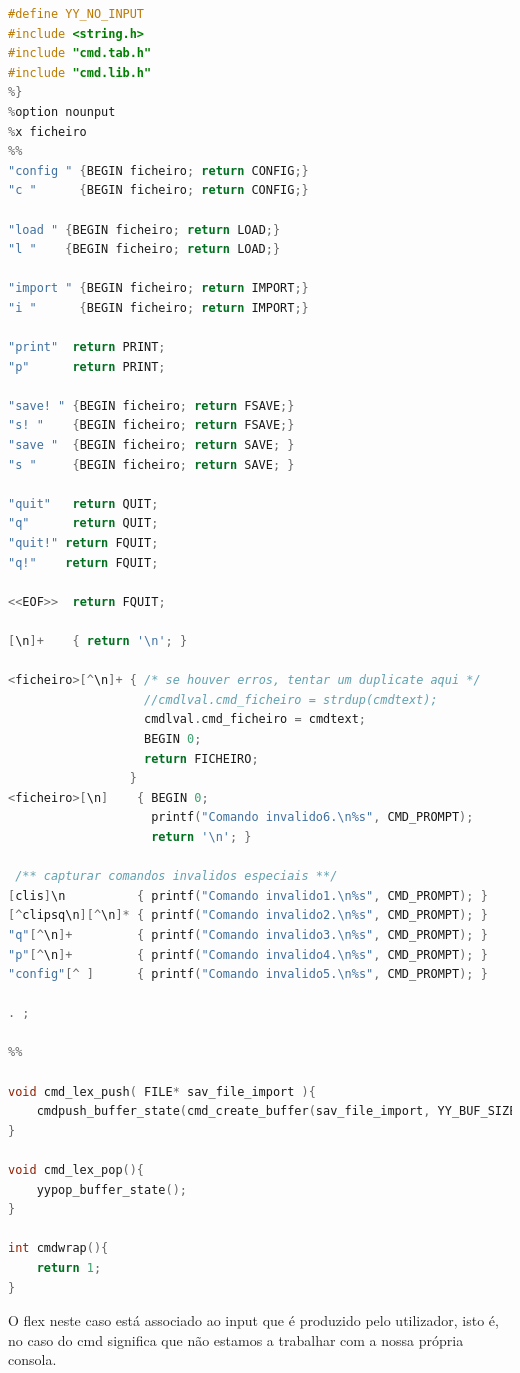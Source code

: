 \documentclass[11pt, a4paper, oneside]{article}
\begin{document}
\begin{lstlisting}[language=C, caption={Flex do ficheiro cmd.}]
%{
#define YY_NO_INPUT
#include <string.h>
#include "cmd.tab.h"
#include "cmd.lib.h"
%}
%option nounput
%x ficheiro
%%
"config " {BEGIN ficheiro; return CONFIG;}
"c "      {BEGIN ficheiro; return CONFIG;}

"load " {BEGIN ficheiro; return LOAD;}
"l "    {BEGIN ficheiro; return LOAD;}

"import " {BEGIN ficheiro; return IMPORT;}
"i "      {BEGIN ficheiro; return IMPORT;}

"print"  return PRINT;
"p"      return PRINT;

"save! " {BEGIN ficheiro; return FSAVE;}
"s! "    {BEGIN ficheiro; return FSAVE;}
"save "  {BEGIN ficheiro; return SAVE; }
"s "     {BEGIN ficheiro; return SAVE; }

"quit"   return QUIT;
"q"      return QUIT;
"quit!" return FQUIT;
"q!"    return FQUIT;

<<EOF>>  return FQUIT;

[\n]+    { return '\n'; }

<ficheiro>[^\n]+ { /* se houver erros, tentar um duplicate aqui */
                   //cmdlval.cmd_ficheiro = strdup(cmdtext);
                   cmdlval.cmd_ficheiro = cmdtext;
                   BEGIN 0;
                   return FICHEIRO;
                 }
<ficheiro>[\n]    { BEGIN 0;
                    printf("Comando invalido6.\n%s", CMD_PROMPT);
                    return '\n'; }

 /** capturar comandos invalidos especiais **/
[clis]\n          { printf("Comando invalido1.\n%s", CMD_PROMPT); }
[^clipsq\n][^\n]* { printf("Comando invalido2.\n%s", CMD_PROMPT); }
"q"[^\n]+         { printf("Comando invalido3.\n%s", CMD_PROMPT); }
"p"[^\n]+         { printf("Comando invalido4.\n%s", CMD_PROMPT); }
"config"[^ ]      { printf("Comando invalido5.\n%s", CMD_PROMPT); }

. ;

%%

void cmd_lex_push( FILE* sav_file_import ){
    cmdpush_buffer_state(cmd_create_buffer(sav_file_import, YY_BUF_SIZE));
}

void cmd_lex_pop(){
    yypop_buffer_state();
}

int cmdwrap(){
    return 1;
}
\end{lstlisting}

O \textsf{flex} neste caso está associado ao input que é produzido pelo utilizador, isto é, no caso do cmd significa que não estamos a trabalhar com a nossa própria consola.
\end{document}
